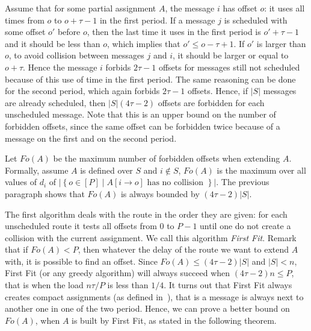 \documentclass[a4paper,UKenglish,cleveref, autoref, thm-restate]{lipics-v2019}
\begin{document}
Assume that for some partial assignment $A$, the message $i$ has offset $o$: it uses all times from $o$ to $o + \tau -1$ in the first period. If a message $j$ is scheduled with some offset $o'$ before $o$, then the last time it uses in the first period is $o'+\tau-1$ and it should be less than $o$, which implies that $o' \leq o - \tau + 1$. If $o'$ is larger than $o$, to avoid collision between messages $j$ and $i$, it should be larger or equal to $o+ \tau$. Hence the message $i$ forbids $2\tau -1$ offsets for messages still not scheduled because of this use of time in the first period. The same reasoning can be done for the second period, which again forbids $2\tau -1$ offsets. Hence, if $|S|$ messages are already scheduled, then $|S|(4\tau -2)$ offsets are forbidden for each unscheduled message. Note that this is an upper bound on the number of forbidden offsets, since the same offset can be forbidden twice because of a message on the first and on the second period.


Let $Fo(A)$ be the maximum number of forbidden offsets when extending $A$. Formally, assume $A$ is defined over $S$ and $i\notin S$, $Fo(A)$ is the maximum over all values of $d_i$ of $|\left\{ o \in [P] \mid A[i \rightarrow o] \text{ has no collision }\right\}|$. The previous paragraph shows that $Fo(A)$ is always bounded by $(4 \tau -2)|S|$. 

The first algorithm deals with the route in the order they are given:  for each unscheduled route it tests all offsets from $0$ to $P-1$ until one do not create a collision with the current assignment.
We call this algorithm \emph{First Fit}. Remark that if $Fo(A) < P$, then whatever the delay of the route we want to extend $A$ with, it is possible to find an offset. Since $Fo(A) \leq (4 \tau -2)|S|$ and $|S| < n$, First Fit (or any greedy algorithm) will always succeed when $(4 \tau -2)n \leq P$, that is when the load $ n\tau /P$ is less than $1/4$.
It turns out that First Fit always creates compact assignments (as defined in~\cite{dominique2018deterministic}), that is a message is always next to another one in one of the two period. Hence, we can prove a better bound on $Fo(A)$, when $A$ is built by First Fit, as stated in the following theorem.
\end{document}
